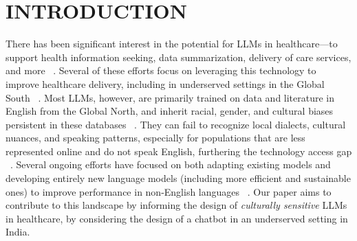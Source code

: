 \section{INTRODUCTION}

There has been significant interest in the potential for LLMs in healthcare---to support health information seeking, data summarization, delivery of care services, and more ~\cite{singhal2023large, shahsavar2023role, zhou2023survey}. Several of these efforts focus on leveraging this technology to improve healthcare delivery, including in underserved settings in the Global South ~\cite{kimblack2022, tsengunder, 10.1007/978-3-030-60114-0_10}.
Most LLMs, however, are primarily trained on data and literature in English from the Global North, and inherit racial, gender, and cultural biases persistent in these databases ~\cite{8418155, denecke2021evaluation}. 
They can fail to recognize local dialects, cultural nuances, and speaking patterns, especially for populations that are less represented online and do not speak English, furthering the technology access gap ~\cite{adilazuarda2024measuringmodelingculturellms, ondrejova2024can, li2024culturellm}. 
Several ongoing efforts have focused on both adapting existing models and developing entirely new language models (including more efficient and sustainable ones) to improve performance in non-English languages ~\cite{10.1007/978-3-030-60114-0_10,  Ożegalska-Łukasik_Łukasik_2023,10.1145/3639856.3639890}. Our paper aims to contribute to this landscape by informing the design of \textit{culturally sensitive} LLMs in healthcare, by considering the design of a chatbot in an underserved setting in India.


